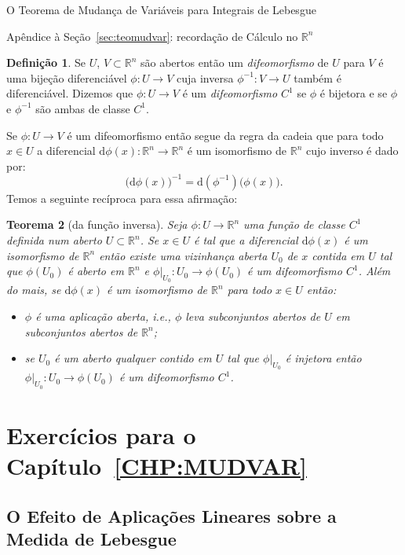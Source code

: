 \documentclass[oneside,final,11pt]{amsbook}
\newcommand{\R}{\mathds R}
\newcommand{\dd}{\mathrm d}
\theoremstyle{remark}\newtheorem{exercise}{Exercício}[chapter]
\theoremstyle{remark}\newtheorem{*exercise}[exercise]{\hbox to 0pt{\hskip 0pt minus 1fil*}Exercício}
\theoremstyle{definition}\newtheorem{exdefin}{Definição}[chapter]
\theoremstyle{plain}\newtheorem{teo}{Teorema}[section]
\theoremstyle{plain}\newtheorem{lem}[teo]{Lema}
\theoremstyle{plain}\newtheorem{prop}[teo]{Proposição}
\theoremstyle{plain}\newtheorem{cor}[teo]{Corolário}
\theoremstyle{definition}\newtheorem{defin}[teo]{Definição}
\theoremstyle{remark}\newtheorem{rem}[teo]{Observação}
\theoremstyle{definition}\newtheorem{notation}[teo]{Notação}
\theoremstyle{definition}\newtheorem{convention}[teo]{Convenção}
\theoremstyle{definition}\newtheorem{example}[teo]{Exemplo}
\numberwithin{section}{chapter}
\numberwithin{equation}{section}
\begin{document}
\begin{chapter}{O Teorema de Mudança de Variáveis para Integrais de Lebesgue}
\begin{section}[recordação de Cálculo no $\R^n$]{Apêndice à Seção~\ref{sec:teomudvar}: recordação de Cálculo no ${\R^n}$}
\begin{defin}
Se $U$, $V\subset\R^n$ são abertos então um {\em difeomorfismo\/}
de $U$ para $V$ é uma bijeção diferenciável
$\phi:U\to V$ cuja inversa $\phi^{-1}:V\to U$ também é diferenciável. Dizemos que $\phi:U\to V$ é um {\em difeomorfismo $C^1$}
se $\phi$ é bijetora e se $\phi$ e $\phi^{-1}$ são ambas de classe $C^1$.
\end{defin}
Se $\phi:U\to V$ é um difeomorfismo então segue da regra da cadeia que para todo $x\in U$ a diferencial
$\dd\phi(x):\R^n\to\R^n$ é um isomorfismo de $\R^n$ cujo inverso é dado por:
\begin{equation}\label{eq:difinverso}
\big(\dd\phi(x)\big)^{-1}=\dd(\phi^{-1})\big(\phi(x)\big).
\end{equation}
Temos a seguinte recíproca para essa afirmação:
\begin{teo}[da função inversa]
\label{thm:TFI}
Seja $\phi:U\to\R^n$ uma função de classe $C^1$ definida num aberto $U\subset\R^n$. Se $x\in U$ é tal que a diferencial
$\dd\phi(x)$ é um isomorfismo de $\R^n$ então existe uma vizinhança aberta $U_0$ de $x$ contida em $U$
tal que $\phi(U_0)$ é aberto em $\R^n$ e $\phi\vert_{U_0}:U_0\to\phi(U_0)$ é um difeomorfismo $C^1$. Além do mais,
se $\dd\phi(x)$ é um isomorfismo de $\R^n$ para todo $x\in U$ então:
\begin{itemize}
\item $\phi$ é uma {\em aplicação aberta},
i.e., $\phi$ leva subconjuntos abertos de $U$ em subconjuntos abertos de $\R^n$;
\item se $U_0$ é um aberto qualquer contido em $U$ tal que $\phi\vert_{U_0}$ é injetora então $\phi\vert_{U_0}:U_0\to\phi(U_0)$
é um difeomorfismo $C^1$.
\end{itemize}
\end{teo}

\end{section}

\section*{Exercícios para o Capítulo~\ref{CHP:MUDVAR}}

\subsection*{O Efeito de Aplicações Lineares sobre a Medida de Lebesgue}


\end{chapter}
\end{document}
